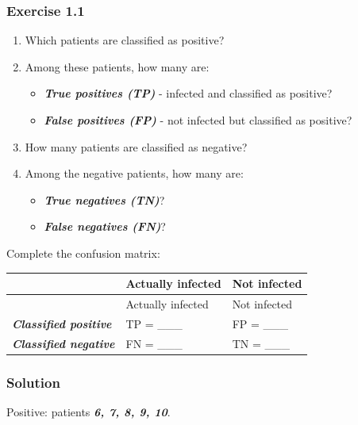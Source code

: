 \documentclass[10pt]{article}
\begin{document}
\subsubsection*{Exercise 1.1}
\begin{enumerate}
\item
Which patients are classified as positive?

\item
Among these patients, how many are:

\begin{itemize}
\item
\textbf{\textit{True positives (TP)}} - infected and classified as positive?

\item
\textbf{\textit{False positives (FP)}} - not infected but classified as positive?

\end{itemize}
\item
How many patients are classified as negative?

\item
Among the negative patients, how many are:

\begin{itemize}
\item
\textbf{\textit{True negatives (TN)}}?

\item
\textbf{\textit{False negatives (FN)}}?

\end{itemize}
\end{enumerate}
Complete the confusion matrix:

\begingroup
\small
\setlength{\tabcolsep}{4pt}
\begin{longtable}{l|l|l}
\rule{0pt}{2.4ex} & Actually infected & Not infected \\[3pt]
\hline
\endfirsthead
\rule{0pt}{2.4ex} & Actually infected & Not infected \\[3pt]
\hline
\endhead
\textbf{\textit{Classified positive}} & TP = \_\_\_ & FP = \_\_\_ \\[1.5pt]
\textbf{\textit{Classified negative}} & FN = \_\_\_ & TN = \_\_\_ \\[1.5pt]
\end{longtable}
\endgroup
\begingroup\color{red}

\subsubsection*{Solution}
Positive: patients \textbf{\textit{6, 7, 8, 9, 10}}.
\end{document}
